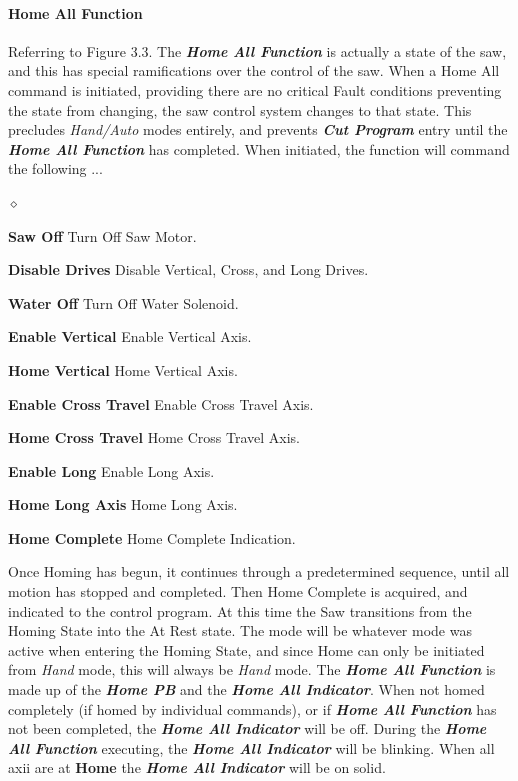 \paragraph*{Home All Function} Referring to Figure 3.3. The \textbf{\textit{Home All Function}} is actually a state of the saw, and this has special ramifications over the control of the saw. When a Home All command is initiated, providing there are no critical Fault conditions preventing the state from changing, the saw control system changes to that state. This precludes \textit{Hand/Auto} modes entirely, and prevents \textit{\textbf{Cut Program}} entry until the \textit{\textbf{Home All Function}} has completed. When initiated, the function will command the following ...
\begin{list}{$\diamond$}{}
	\item \textbf{Saw Off} Turn Off Saw Motor.
	\item \textbf{Disable Drives} Disable Vertical, Cross, and Long Drives.
	\item \textbf{Water Off} Turn Off Water Solenoid.
	\item \textbf{Enable Vertical} Enable Vertical Axis.
	\item \textbf{Home Vertical} Home Vertical Axis.
	\item \textbf{Enable Cross Travel} Enable Cross Travel Axis.
	\item \textbf{Home Cross Travel} Home Cross Travel Axis.
	\item \textbf{Enable Long} Enable Long Axis.
	\item \textbf{Home Long Axis} Home Long Axis.
	\item \textbf{Home Complete} Home Complete Indication.
\end{list}
Once Homing has begun, it continues through a predetermined sequence, until all motion has stopped and completed. Then Home Complete is acquired, and indicated to the control program. At this time the Saw transitions from the Homing State into the At Rest state. The mode will be whatever mode was active when entering the Homing State, and since Home can only be initiated from \textit{Hand} mode, this will always be \textit{Hand} mode. The \textbf{\textit{Home All Function}} is made up of the \textbf{\textit{Home PB}} and the \textbf{\textit{Home All Indicator}}. When not homed completely (if homed by individual commands), or if \textbf{\textit{Home All Function}} has not been completed, the \textbf{\textit{Home All Indicator}} will be off. During the \textbf{\textit{Home All Function}} executing, the \textbf{\textit{Home All Indicator}} will be blinking. When all axii are at \textbf{Home} the \textbf{\textit{Home All Indicator}} will be on solid.
